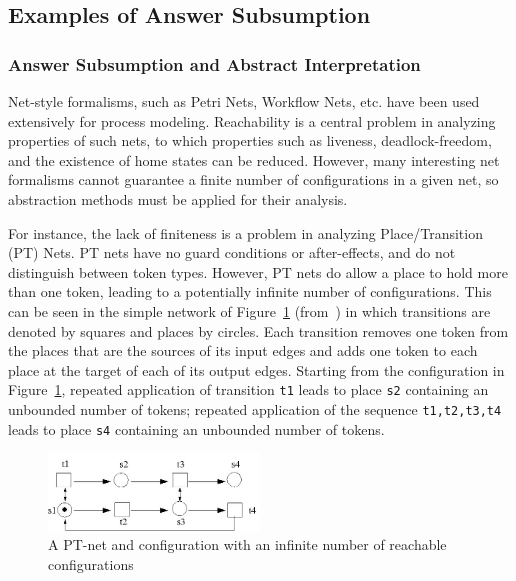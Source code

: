 \subsection{Examples of Answer Subsumption} \label{sec:answer-subsumption-examples}

\subsubsection{Answer Subsumption and Abstract Interpretation} \label{sec:abs-int}
%
Net-style formalisms, such as Petri Nets, Workflow Nets, etc. have
been used extensively for process modeling.  Reachability is a central
problem in analyzing properties of such nets, to which properties such
as liveness, deadlock-freedom, and the existence of home states can be
reduced.  However, many interesting net formalisms cannot guarantee a
finite number of configurations in a given net, so abstraction methods
must be applied for their analysis.

For instance, the lack of finiteness is a problem in analyzing
Place/Transition (PT) Nets.  PT nets have no guard conditions or
after-effects, and do not distinguish between token types.  However,
PT nets do allow a place to hold more than one token, leading to a
potentially infinite number of configurations.  This can be seen in
the simple network of Figure~\ref{fig:ptnet} (from~\cite{DesR98}) in
which transitions are denoted by squares and places by circles.  Each
transition removes one token from the places that are the sources
of its input edges and adds one token to each place at the target of
each of its output edges.  Starting from the configuration in
Figure~\ref{fig:ptnet}, repeated application of transition {\tt t1}
leads to place {\tt s2} containing an unbounded number of tokens;
repeated application of the sequence {\tt t1,t2,t3,t4} leads to place
{\tt s4} containing an unbounded number of tokens.
%
\begin{figure}
\centering
\includegraphics[width=0.5\textwidth]{omegaNet}
\caption{A PT-net and configuration with an infinite number of reachable configurations} 
\label{fig:ptnet}
\end{figure}
%

